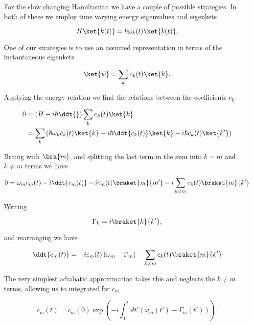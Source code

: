 For the slow changing Hamiltonian we have a couple of possible strategies.  In both of these we employ time varying energy eigenvalues and eigenkets

\begin{equation}\label{eqn:qmTwoExamReflection:390}
H \ket{k(t)} = \hbar \omega_k(t) \ket{k(t)},
\end{equation}

One of our strategies is to use an assumed representation in terms of the instantaneous eigenkets

\begin{equation}\label{eqn:qmTwoExamReflection:410}
\ket{\psi} = \sum_k c_k(t) \ket{k}.
\end{equation}

Applying the energy relation we find the relations between the coefficients $c_k$

\begin{align*}
0 
&= \left( 
H - i \hbar \ddt{}
\right)
\sum_k c_k(t) \ket{k} 
\\
&= 
\sum_k 
\left(
\hbar \omega_k 
c_k(t) \ket{k} 
-i \hbar
\ddt{c_k(t)} \ket{k} 
-i \hbar
c_k(t) \ket{k'} 
\right)
\end{align*}

Braing with $\bra{m}$, and splitting the last term in the sum into $k = m$ and $k \ne m$ terms we have

\begin{equation}\label{eqn:qmTwoExamReflection:430}
0 
=
\omega_m 
c_m(t) 
-i 
\ddt{c_m(t)} 
-i 
c_m(t) \braket{m}{m'} 
-i 
\sum_{k \ne m}
c_k(t) \braket{m}{k'} 
\end{equation}

Writing

\begin{equation}\label{eqn:qmTwoExamReflection:450}
\Gamma_k = i \braket{k}{k'},
\end{equation}

and rearranging we have

\begin{equation}\label{eqn:qmTwoExamReflection:470}
\ddt{c_m(t)} 
=
-i c_m(t) 
\left( \omega_m - \Gamma_m \right)
- 
\sum_{k \ne m}
c_k(t) \braket{m}{k'} 
\end{equation}

The very simplest adiabatic approximation takes this and neglects the $k \ne m$ terms, allowing us to integrated for $c_m$

\begin{equation}\label{eqn:qmTwoExamReflection:490}
c_m(t)
=
c_m(0) \exp\left( -i \int_0^t dt' \left( \omega_m(t') - \Gamma_m(t') \right) \right).
\end{equation}

